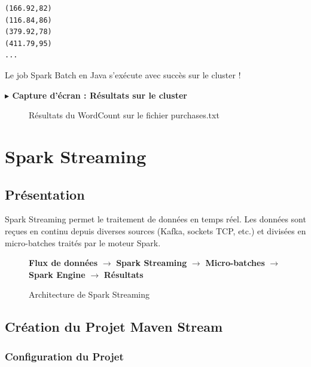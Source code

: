 \documentclass[12pt,a4paper]{report}
\newcommand{\etape}[1]{\vspace{6pt}\textbf{\color{bleuESP}$\blacktriangleright$ #1}\vspace{4pt}}
\begin{document}
\begin{successbox}
\begin{verbatim}
(166.92,82)
(116.84,86)
(379.92,78)
(411.79,95)
...
\end{verbatim}
Le job Spark Batch en Java s'exécute avec succès sur le cluster !
\end{successbox}

\etape{Capture d'écran : Résultats sur le cluster}
\begin{figure}[H]
  \centering
  \caption{Résultats du WordCount sur le fichier purchases.txt}
\end{figure}

\chapter{Spark Streaming}

\section{Présentation}

Spark Streaming permet le traitement de données en temps réel. Les données sont reçues en continu depuis diverses sources (Kafka, sockets TCP, etc.) et divisées en micro-batches traités par le moteur Spark.

\begin{figure}[H]
\centering
\begin{tcolorbox}[
  colback=bleuESP!5,
  colframe=bleuESP,
  width=0.9\textwidth,
  halign=center
]
\textbf{Flux de données} $\longrightarrow$ \textbf{Spark Streaming} $\longrightarrow$ \textbf{Micro-batches} $\longrightarrow$ \textbf{Spark Engine} $\longrightarrow$ \textbf{Résultats}
\end{tcolorbox}
\caption{Architecture de Spark Streaming}
\end{figure}

\section{Création du Projet Maven Stream}

\subsection{Configuration du Projet}
\end{document}
